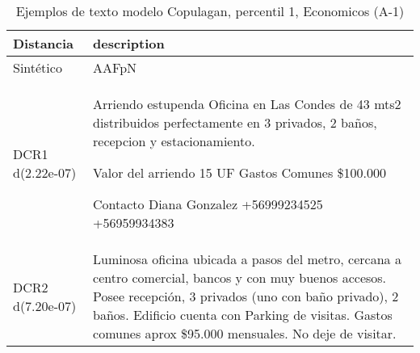 \begin{table}[H]
\centering
\fontsize{10}{14}\selectfont
\caption{Ejemplos de texto modelo Copulagan, percentil 1, Economicos (A-1)}
\label{table-example-economicos-a-1-copulagan-1p-text}
\begin{tabular}{|l|m{35em}|}
\hline
\rowcolor[gray]{0.8}
Distancia & description \\
\hline Sintético & AAFpN \\
\hline DCR1 d(2.22e-07) & Arriendo estupenda Oficina en Las Condes de 43 mts2 distribuidos perfectamente en 3 privados, 2 ba\~nos, recepcion y estacionamiento. 

Valor del arriendo 15 UF
Gastos Comunes \$100.000

Contacto 
Diana Gonzalez
+56999234525
+56959934383 \\
\hline DCR2 d(7.20e-07) & Luminosa oficina ubicada a pasos del metro, cercana a centro comercial, bancos y con muy buenos accesos. Posee recepci\'on, 3 privados (uno con ba\~no privado), 2 ba\~nos. Edificio cuenta con Parking de visitas. Gastos comunes aprox \$95.000 mensuales. No deje de visitar. \\
\hline
\end{tabular}
\end{table}
